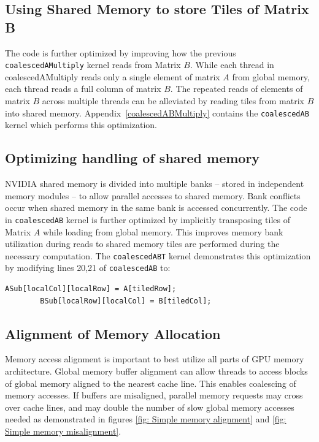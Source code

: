 \documentclass[review=false, sigchi]{acmart}
\begin{document}
	
	\subsection{Using Shared Memory to store Tiles of Matrix B} 
	
	The code is further optimized by improving how the previous \texttt{coalescedAMultiply} kernel reads from Matrix $B$.
	While each thread in coalescedAMultiply reads only a single element of matrix $A$ from global memory, each thread reads a full column of matrix $B$.
	The repeated reads of elements of matrix $B$ across multiple threads can be alleviated by reading tiles from matrix $B$ into shared memory.
	Appendix~\ref{coalescedABMultiply} contains the \texttt{coalescedAB} kernel which performs this optimization.
	
	\subsection{Optimizing handling of shared memory} 
	
	NVIDIA shared memory is divided into multiple banks -- stored in independent memory modules -- to allow parallel accesses to shared memory. Bank conflicts occur when shared memory in the same bank is accessed concurrently. The code in \texttt{coalescedAB} kernel is further optimized by implicitly transposing tiles of Matrix $A$ while loading from global memory. This improves memory bank utilization during reads to shared memory tiles are performed during the necessary computation. The \texttt{coalescedABT} kernel demonstrates this optimization by modifying lines 20,21 of \texttt{coalescedAB} to:
	
	\begin{lstlisting}[firstnumber=20]
		ASub[localCol][localRow] = A[tiledRow];
		BSub[localRow][localCol] = B[tiledCol];
	\end{lstlisting}
	
	
	\subsection{Alignment of Memory Allocation}
	
	Memory access alignment is important to best utilize all parts of GPU memory architecture. Global memory buffer alignment can allow threads to access blocks of global memory aligned to the nearest cache line. This enables coalescing of memory accesses. If buffers are misaligned, parallel memory requests may cross over cache lines, and may double the number of slow global memory accesses needed as demonstrated in figures \ref{fig: Simple memory alignment} and \ref{fig: Simple memory misalignment}.
	
\end{document}
